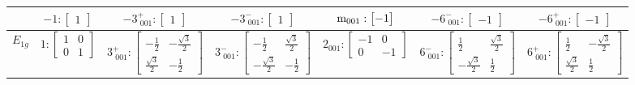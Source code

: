 \documentclass[fleqn,8pt,landscape]{jsarticle}
\begin{document}
\begin{longtable}{ccccccc}
& $ -1:\begin{bmatrix} 1 \end{bmatrix} $ & $ -3^{+}_{\,\,001}:\begin{bmatrix} 1 \end{bmatrix} $ & $ -3^{-}_{\,\,001}:\begin{bmatrix} 1 \end{bmatrix} $ & $ {\rm m}_{001}:\begin{bmatrix} -1 \end{bmatrix} $ & $ -6^{-}_{\,\,001}:\begin{bmatrix} -1 \end{bmatrix} $ & $ -6^{+}_{\,\,001}:\begin{bmatrix} -1 \end{bmatrix} $ \\ \hline
$ E_{1g} $ & $ 1:\begin{bmatrix} 1 & 0 \\ 0 & 1 \end{bmatrix} $ & $ 3^{+}_{\,\,001}:\begin{bmatrix} - \frac{1}{2} & - \frac{\sqrt{3}}{2} \\ \frac{\sqrt{3}}{2} & - \frac{1}{2} \end{bmatrix} $ & $ 3^{-}_{\,\,001}:\begin{bmatrix} - \frac{1}{2} & \frac{\sqrt{3}}{2} \\ - \frac{\sqrt{3}}{2} & - \frac{1}{2} \end{bmatrix} $ & $ 2{}_{001}:\begin{bmatrix} -1 & 0 \\ 0 & -1 \end{bmatrix} $ & $ 6^{-}_{\,\,001}:\begin{bmatrix} \frac{1}{2} & \frac{\sqrt{3}}{2} \\ - \frac{\sqrt{3}}{2} & \frac{1}{2} \end{bmatrix} $ & $ 6^{+}_{\,\,001}:\begin{bmatrix} \frac{1}{2} & - \frac{\sqrt{3}}{2} \\ \frac{\sqrt{3}}{2} & \frac{1}{2} \end{bmatrix} $ \\

\end{longtable}
\end{document}
